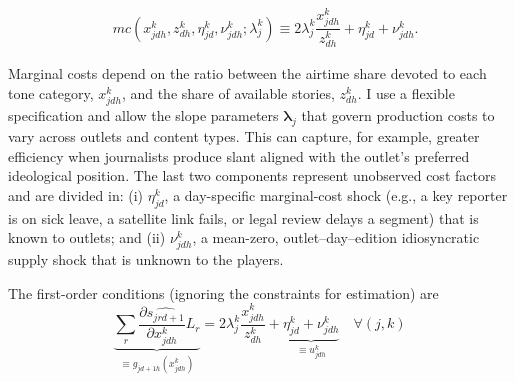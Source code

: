 \documentclass[12pt]{article}
\begin{document}
\begin{equation*}\label{}
	\begin{aligned}
		& mc(x_{jdh}^k,z_{dh}^k,\eta_{jd}^k,\nu_{jdh}^k; \lambda_j^k )\equiv     2\lambda_j^k  \dfrac{x_{jdh}^k}{z_{dh}^k} + \eta_{jd}^k + \nu_{jdh}^k.
	\end{aligned}
	\end{equation*} 


Marginal costs depend on the ratio between the airtime share devoted to each tone category, $x_{jdh}^k$, and the share of available stories, $z_{dh}^k$. I use a flexible specification and allow the slope parameters $\bm{\lambda}_j$ that govern production costs to vary across outlets and content types. This can capture, for example, greater efficiency when journalists produce slant aligned with the outlet’s preferred ideological position. The last two components represent unobserved cost factors and are divided in: (i) $\eta_{jd}^k$, a {day-specific} marginal-cost shock (e.g., a key reporter is on sick leave, a satellite link fails, or legal review delays a segment) that is known to outlets; and (ii) $\nu_{jdh}^k$, a mean-zero, outlet–day–edition idiosyncratic supply shock that is unknown to the players.



 
 
 
 


The first-order conditions (ignoring the  constraints for estimation) are
\begin{equation}\label{eq:focs}
	\underbrace{\sum_{r}\frac{\partial \widehat{s_{jrd+1}}}{\partial x_{jdh}^k}L_r}_{\equiv g_{jd+1h}(x_{jdh}^k)}
	= 2\lambda_j^k\frac{x_{jdh}^k}{z_{dh}^k}  
	+ \underbrace{\eta_{jd}^k+\nu_{jdh}^k}_{\equiv u_{jdh}^k}
	\quad \forall(j,k)
\end{equation}
\end{document}

